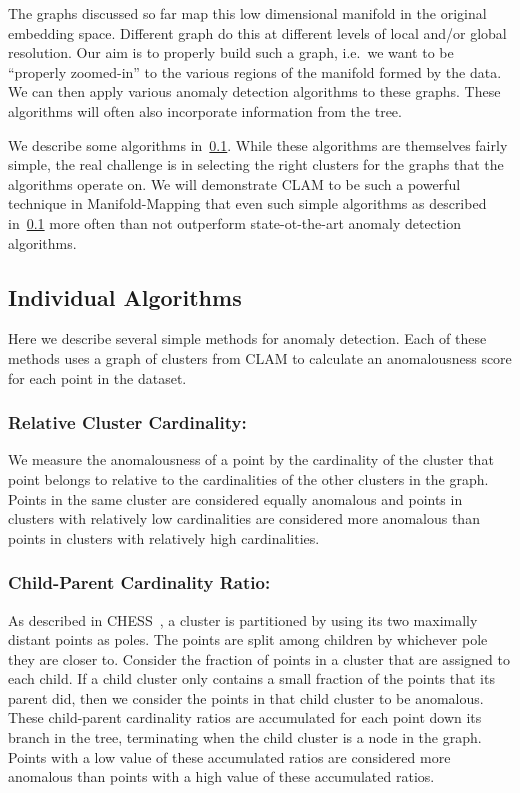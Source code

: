 The graphs discussed so far map this low dimensional manifold in the original embedding space.
Different graph do this at different levels of local and/or global resolution.
Our aim is to properly build such a graph, i.e.\ we want to be ``properly zoomed-in'' to the various regions of the manifold formed by the data.
We can then apply various anomaly detection algorithms to these graphs.
These algorithms will often also incorporate information from the tree.

We describe some algorithms in~\ref{subsec:chaoda:individual-algorithms}.
While these algorithms are themselves fairly simple, the real challenge is in selecting the right clusters for the graphs that the algorithms operate on.
We will demonstrate CLAM to be such a powerful technique in Manifold-Mapping that even such simple algorithms as described in~\ref{subsec:chaoda:individual-algorithms} more often than not outperform state-ot-the-art anomaly detection algorithms.

\subsection{Individual Algorithms}
\label{subsec:chaoda:individual-algorithms}

Here we describe several simple methods for anomaly detection.
Each of these methods uses a graph of clusters from CLAM to calculate an anomalousness score for each point in the dataset.

\subsubsection{Relative Cluster Cardinality:}
We measure the anomalousness of a point by the cardinality of the cluster that point belongs to relative to the cardinalities of the other clusters in the graph.
Points in the same cluster are considered equally anomalous and points in clusters with relatively low cardinalities are considered more anomalous than points in clusters with relatively high cardinalities.

\subsubsection{Child-Parent Cardinality Ratio:}
As described in CHESS~\cite{ishaq2019entropy}, a cluster is partitioned by using its two maximally distant points as poles.
The points are split among children by whichever pole they are closer to.
Consider the fraction of points in a cluster that are assigned to each child.
If a child cluster only contains a small fraction of the points that its parent did, then we consider the points in that child cluster to be anomalous.
These child-parent cardinality ratios are accumulated for each point down its branch in the tree, terminating when the child cluster is a node in the graph.
Points with a low value of these accumulated ratios are considered more anomalous than points with a high value of these accumulated ratios.

